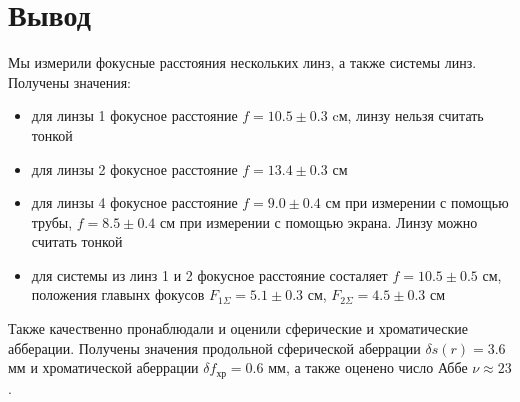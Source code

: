 \documentclass[a4paper,12pt]{article}
\theoremstyle{definition}
\begin{document}
\section*{Вывод}
Мы измерили фокусные расстояния нескольких линз, а также системы линз. Получены значения:
\begin{itemize}
    \item для линзы 1 фокусное расстояние $f = 10.5 \pm 0.3$ cм, линзу нельзя считать тонкой
    \item для линзы 2 фокусное расстояние $f = 13.4 \pm 0.3$ см
    \item для линзы 4 фокусное расстояние $f = 9.0 \pm 0.4$ см при измерении с помощью трубы, $f = 8.5 \pm 0.4$ см при измерении с помощью экрана. Линзу можно считать тонкой
    \item для системы из линз 1 и 2 фокусное расстояние состаляет $f = 10.5 \pm 0.5$ см, положения главынх фокусов $F_{1\Sigma} = 5.1 \pm 0.3$ см, $F_{2\Sigma} = 4.5 \pm 0.3$ см
\end{itemize}
Также качественно пронаблюдали и оценили сферические и хроматические абберации. Получены значения продольной сферической аберрации $\delta s(r) = 3.6$ мм и хроматической аберрации $\delta f_\text{хр} = 0.6$ мм, а также оценено число Аббе $\nu \approx 23$.
\end{document}
